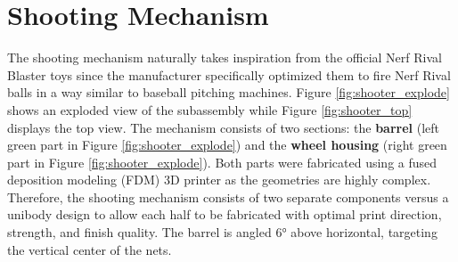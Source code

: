 \section{Shooting Mechanism}
The shooting mechanism naturally takes inspiration from the official Nerf Rival Blaster toys since the manufacturer specifically optimized them to fire Nerf Rival balls in a way similar to baseball pitching machines. Figure \ref{fig:shooter_explode} shows an exploded view of the subassembly while Figure \ref{fig:shooter_top} displays the top view. The mechanism consists of two sections: the \textbf{barrel} (left green part in Figure \ref{fig:shooter_explode}) and the \textbf{wheel housing} (right green part in Figure \ref{fig:shooter_explode}). Both parts were fabricated using a fused deposition modeling (FDM) 3D printer as the geometries are highly complex. Therefore, the shooting mechanism consists of two separate components versus a unibody design to allow each half to be fabricated with optimal print direction, strength, and finish quality. The barrel is angled \ang{6} above horizontal, targeting the vertical center of the nets.

